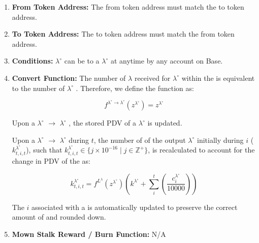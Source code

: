\documentclass[class=article, crop=false]{standalone}
\begin{document}
\begin{enumerate}

    \item \textbf{From Token Address:} The from token address must match the to token address.
    
    \item \textbf{To Token Address:} The to token address must match the from token address.
    
    \item \textbf{Conditions:}  $\lambda^{\circ}$ can be  to a $\lambda^{\circ}$  at anytime by any account on Base.
    
    \item \textbf{Convert Function:} The number of $\lambda$ received for   $\lambda^{\circ}$ within the  is equivalent to the number of $\lambda^{\circ}$ . Therefore, we define the function as:
    
        $$
            f^{\lambda^{\circ} \rightarrow \lambda^{\circ}}(z^{\lambda^{\circ}}) = 
                z^{\lambda^{\circ}}
        $$
        
    Upon a $\lambda^{\circ}$ $\rightarrow$ $\lambda^{\circ}$ , the stored PDV of a $\lambda^{\circ}$  is updated.

    Upon a $\lambda^{\circ}$ $\rightarrow$ $\lambda^{\circ}$  during $t$, the number of  of the output $\lambda^{\circ}$  initially  during $i$ ($k_{t,i,t}^{\lambda^{\circ}}$), such that $k_{t,i,t}^{\lambda^{\circ}} \in \{j \times 10^{-16} \mid j \in \mathbb{Z}^{+} \}$, is recalculated to account for the change in PDV of the  as:

    $$
        k_{t,i,t}^{\lambda^{\circ}} = 
            f^{L^{\lambda}}\left(z^{\lambda^{\circ}}\right) 
            \left( 
                k^{\lambda^{\circ}} + 
                \sum_{i}^{t} 
                \left
                    (\frac{c_{i}^{\lambda^{\circ}}}
                            {10000}
                \right) 
            \right)
    $$

    The $i$ associated with a   is automatically updated to preserve the correct amount of  and rounded down.

    \item \textbf{Mown Stalk Reward / Burn Function:} N/A

\end{enumerate}
\end{document}
